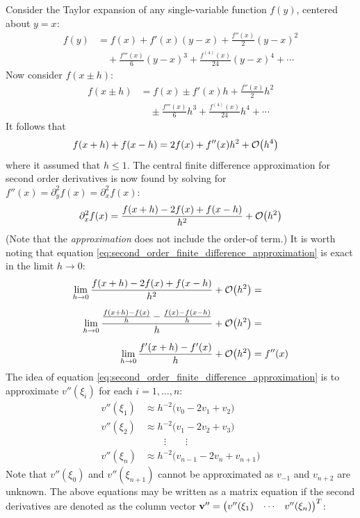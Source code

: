 \documentclass[reprint,english]{revtex4-1}
\begin{document}
Consider the Taylor expansion of any single-variable function \(f(y)\), centered about \(y=x\):
\begin{align}
f(y)&= f(x)+f'(x)(y-x)+\frac{f''(x)}{2}(y-x)^2\nonumber\\
&\quad +\frac{f'''(x)}{6}(y-x)^3+\frac{f^{(4)}(x)}{24}(y-x)^4+\cdots\label{eq:second_order_taylor_expansion}
\end{align}
Now consider \(f(x\pm h)\):
\begin{align}
f(x\pm h)&=f(x)\pm f'(x)h+\frac{f''(x)}{2}h^2\nonumber\\
&\quad \pm\frac{f'''(x)}{6}h^3+\frac{f^{(4)}(x)}{24}h^4+\cdots
\end{align}
It follows that
\begin{align*}
&f(x+h)+f(x-h)=2f(x)+f''(x)h^2+\order{h^4}
\end{align*}
where it assumed that \(h\leq1\). The central finite difference approximation for second order derivatives is now found by solving for \(f''(x)=\partial_y^2f(x)=\partial_x^2f(x)\):
\begin{equation}\label{eq:second_order_finite_difference_approximation}
\partial_x^2f(x)=\frac{f(x+h)-2f(x)+f(x-h)}{h^2}+\order{h^2}
\end{equation}
(Note that the \emph{approximation} does not include the order-of term.) It is worth noting that equation \eqref{eq:second_order_finite_difference_approximation} is exact in the limit \(h\to0\):
\begin{align*}
\lim_{h\to0}\frac{f(x+h)-2f(x)+f(x-h)}{h^2}+\order{h^2}&=\\[2mm]
\lim_{h\to0}\frac{\frac{f(x+h)-f(x)}{h}-\frac{f(x)-f(x-h)}{h}}{h}+\order{h^2}&=\\[2mm]
\lim_{h\to0}\frac{f'(x+h)-f'(x)}{h}+\order{h^2}&=f''(x)
\end{align*}
The idea of equation \eqref{eq:second_order_finite_difference_approximation} is to approximate \(v''(\xi_i)\) for each \(i=1,\ldots,n\):
\begin{align*}
v''(\xi_1)&\approx h^{-2}\big(v_0-2v_1+v_2\big)\\
v''(\xi_2)&\approx h^{-2}\big(v_1-2v_2+v_3\big)\\
&\qquad\vdots\qquad\vdots\qquad\\
v''(\xi_n)&\approx h^{-2}\big(v_{n-1}-2v_n+v_{n+1}\big)
\end{align*}
Note that \(v''(\xi_0)\) and \(v''(\xi_{n+1})\) cannot be approximated as \(v_{-1}\) and \(v_{n+2}\) are unknown. The above equations may be written as a matrix equation if the second derivatives are denoted as the column vector \(\vb{v}''=\mqty(v''(\xi_1)&\cdots&v''(\xi_n))^T\):
\end{document}
